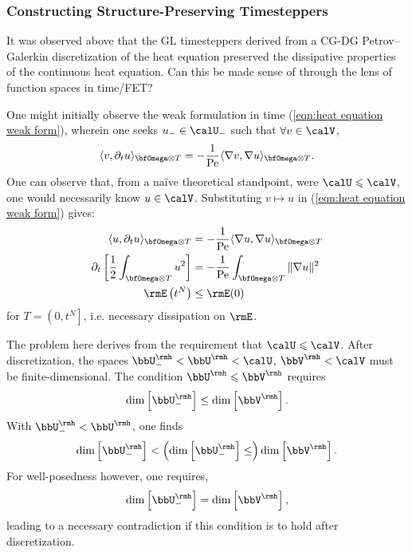 \subsubsection{Constructing Structure-Preserving Timesteppers}
    It was observed above that the GL timesteppers derived from a CG-DG Petrov--Galerkin discretization of the heat equation preserved the dissipative properties of the continuous heat equation. Can this be made sense of through the lens of function spaces in time/FET?

    One might initially observe the weak formulation in time (\ref{eqn:heat equation weak form}), wherein one seeks $u_{-}  \in  \calU_{-}$ such that $\forall  v  \in  \calV$,
    \begin{equation*}
        \langle v, \partial_{t}u\rangle_{\bfOmega\otimes T}  =   - \frac{1}{\rmPe}\langle\nabla v, \nabla u\rangle_{\bfOmega\otimes T}.
    \end{equation*}
    One can observe that, from a naïve theoretical standpoint, were $\calU  \leqslant  \calV$, one would necessarily know $u  \in  \calV$. Substituting $v  \mapsto  u$ in (\ref{eqn:heat equation weak form}) gives:
    \begin{align}
        \langle u, \partial_{t}u\rangle_{\bfOmega\otimes T}  &=   - \frac{1}{\rmPe}\langle\nabla u, \nabla u\rangle_{\bfOmega\otimes T}  \label{eqn:heat equation dissipation proof 1}  \\
        \partial_{t}\left[\frac{1}{2}\int_{\bfOmega\otimes T}u^{2}\right]  &=   - \frac{1}{\rmPe}\int_{\bfOmega\otimes T}\|\nabla u\|^{2}  \\
        \rmE\left(t^{N}\right)  &\leq  \rmE(0)  \label{eqn:heat equation dissipation proof 3}
    \end{align}
    for $T  =  \left(0, t^{N}\right]$, i.e. necessary dissipation on $\rmE$.
    
    The problem here derives from the requirement that $\calU  \leqslant  \calV$. After discretization, the spaces $\bbU^{\rmh}_{-}  <  \bbU^{\rmh}  <  \calU$, $\bbV^{\rmh}  <  \calV$ must be finite-dimensional. The condition $\bbU^{\rmh}  \leqslant  \bbV^{\rmh}$ requires
    \begin{equation}
        \dim\left[\bbU^{\rmh}_{-}\right]  \leq  \dim\left[\bbV^{\rmh}\right].
    \end{equation}
    With $\bbU^{\rmh}_{-}  <  \bbU^{\rmh}$, one finds
    \begin{equation}
        \dim\left[\bbU^{\rmh}_{-}\right]  <  \left(\dim\left[\bbU^{\rmh}_{-}\right]  \leq\right)  \dim\left[\bbV^{\rmh}\right].
    \end{equation}
    For well-posedness however, one requires,
    \begin{equation}
        \dim\left[\bbU^{\rmh}_{-}\right]  =  \dim\left[\bbV^{\rmh}\right],
    \end{equation}
    leading to a necessary contradiction if this condition is to hold after discretization. \contra

